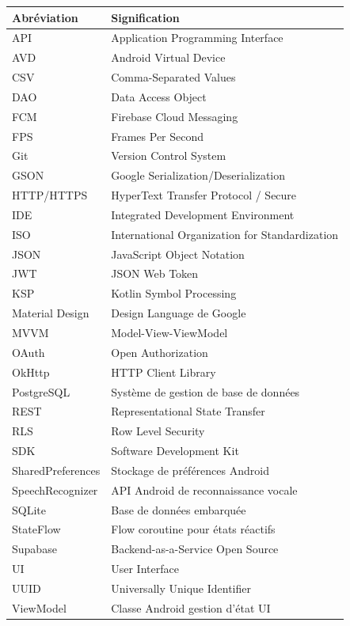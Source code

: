\documentclass[12pt,a4paper,openany]{report}
\begin{document}
    \begin{longtable}{lp{10cm}}
      \toprule
      \textbf{Abréviation} & \textbf{Signification} \\
      \midrule
      \endhead

      \bottomrule
      \endfoot

      API & Application Programming Interface \\
      AVD & Android Virtual Device \\
      CSV & Comma-Separated Values \\
      DAO & Data Access Object \\
      FCM & Firebase Cloud Messaging \\
      FPS & Frames Per Second \\
      Git & Version Control System \\
      GSON & Google Serialization/Deserialization \\
      HTTP/HTTPS & HyperText Transfer Protocol / Secure \\
      IDE & Integrated Development Environment \\
      ISO & International Organization for Standardization \\
      JSON & JavaScript Object Notation \\
      JWT & JSON Web Token \\
      KSP & Kotlin Symbol Processing \\
      Material Design & Design Language de Google \\
      MVVM & Model-View-ViewModel \\
      OAuth & Open Authorization \\
      OkHttp & HTTP Client Library \\
      PostgreSQL & Système de gestion de base de données \\
      REST & Representational State Transfer \\
      RLS & Row Level Security \\
      SDK & Software Development Kit \\
      SharedPreferences & Stockage de préférences Android \\
      SpeechRecognizer & API Android de reconnaissance vocale \\
      SQLite & Base de données embarquée \\
      StateFlow & Flow coroutine pour états réactifs \\
      Supabase & Backend-as-a-Service Open Source \\
      UI & User Interface \\
      UUID & Universally Unique Identifier \\
      ViewModel & Classe Android gestion d'état UI \\

    \end{longtable}
\end{document}
